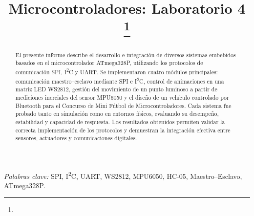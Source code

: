\documentclass[conference]{IEEEtran}
\begin{document}
\title{Microcontroladores: Laboratorio 4\\
{\footnotesize \textsuperscript{}
}
\thanks{}
}

\author{
\and
{}
}
\maketitle

\begin{abstract}
El presente informe describe el desarrollo e integración de diversos sistemas embebidos basados en el microcontrolador ATmega328P, utilizando los protocolos de comunicación SPI, I\textsuperscript{2}C y UART. Se implementaron cuatro módulos principales: comunicación maestro–esclavo mediante SPI e I\textsuperscript{2}C, control de animaciones en una matriz LED WS2812, gestión del movimiento de un punto luminoso a partir de mediciones inerciales del sensor MPU6050 y el diseño de un vehículo controlado por Bluetooth para el Concurso de Mini Fútbol de Microcontroladores. Cada sistema fue probado tanto en simulación como en entornos físicos, evaluando su desempeño, estabilidad y capacidad de respuesta. Los resultados obtenidos permiten validar la correcta implementación de los protocolos y demuestran la integración efectiva entre sensores, actuadores y comunicaciones digitales.
\end{abstract}

\textit{Palabras clave:} SPI, I\textsuperscript{2}C, UART, WS2812, MPU6050, HC-05, Maestro–Esclavo, ATmega328P.








\nocite{*}


\appendix

\end{document}
